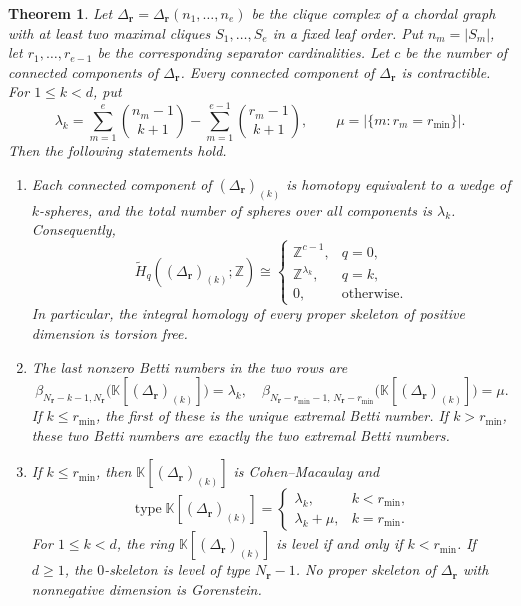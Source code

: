 \documentclass[11pt]{amsart}
\newtheorem{theorem}{Theorem}[section]
\theoremstyle{definition}
\theoremstyle{remark}
\newcommand{\K}{\mathbb K}
\newcommand{\SR}[1]{\K[#1]}
\begin{document}
	\begin{theorem}\label{thm:3}
		Let $\Delta_{\mathbf r}=\Delta_{\mathbf r}(n_1,\ldots,n_e)$ be the clique complex of a chordal graph with at least two maximal cliques $S_1,\ldots,S_e$ in a fixed leaf order. Put $n_m=|S_m|$, let $r_1,\ldots,r_{e-1}$ be the corresponding separator cardinalities. Let $c$ be the number of connected components of $\Delta_{\mathbf r}$. Every connected component of $\Delta_{\mathbf r}$ is contractible. For $1\le k<d$, put
		\[
		\lambda_k=
		\sum_{m=1}^{e}\binom{n_m-1}{k+1}
		-
		\sum_{m=1}^{e-1}\binom{r_m-1}{k+1},
		\qquad
		\mu=\bigl|\{m:r_m=r_{\min}\}\bigr|.
		\]
		Then the following statements hold.
		\begin{enumerate}
			\item[(i)] Each connected component of $(\Delta_{\mathbf r})_{(k)}$ is homotopy equivalent to a wedge of $k$-spheres, and the total number of spheres over all components is $\lambda_k$. Consequently,
			\[
			\widetilde H_q((\Delta_{\mathbf r})_{(k)};\mathbb Z)
			\cong
			\begin{cases}
				\mathbb Z^{c-1},&q=0,\\
				\mathbb Z^{\lambda_k},&q=k,\\
				0,&\text{otherwise}.
			\end{cases}
			\]
			In particular, the integral homology of every proper skeleton of positive dimension is torsion free.
			
			\item[(ii)] The last nonzero Betti numbers in the two rows are
			\[
			\beta_{N_{\mathbf r}-k-1,N_{\mathbf r}}
			\bigl(\SR{(\Delta_{\mathbf r})_{(k)}}\bigr)=\lambda_k,\quad \beta_{N_{\mathbf r}-r_{\min}-1,\,N_{\mathbf r}-r_{\min}}
			\bigl(\SR{(\Delta_{\mathbf r})_{(k)}}\bigr)=\mu.
			\]
			If $k\le r_{\min}$, the first of these is the unique extremal Betti number. If $k>r_{\min}$, these two Betti numbers are exactly the two extremal Betti numbers.
			
			\item[(iii)] If $k\le r_{\min}$, then $\SR{(\Delta_{\mathbf r})_{(k)}}$ is Cohen--Macaulay and
			\[
			\operatorname{type}\SR{(\Delta_{\mathbf r})_{(k)}}
			=
			\begin{cases}
				\lambda_k,&k<r_{\min},\\
				\lambda_k+\mu,&k=r_{\min}.
			\end{cases}
			\]
			For $1\le k<d$, the ring $\SR{(\Delta_{\mathbf r})_{(k)}}$ is level if and only if $k<r_{\min}$. If $d\ge1$, the $0$-skeleton is level of type $N_{\mathbf r}-1$. No proper skeleton of $\Delta_{\mathbf r}$ with nonnegative dimension is Gorenstein.
		\end{enumerate}
	\end{theorem}
	
\end{document}
